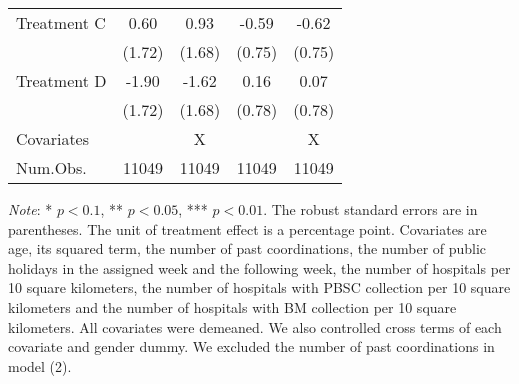 \documentclass[12pt, a4paper]{article}
\begin{document}
\begin{table}[H]
\begin{threeparttable}
\begin{tabular}[t]{lcccc}
\hspace{1em}Treatment C & 0.60 & 0.93 & -0.59 & -0.62\\
\hspace{1em} & (1.72) & (1.68) & (0.75) & (0.75)\\
\hspace{1em}Treatment D & -1.90 & -1.62 & 0.16 & 0.07\\
\hspace{1em} & (1.72) & (1.68) & (0.78) & (0.78)\\
Covariates &  & X &  & X\\
Num.Obs. & \num{11049} & \num{11049} & \num{11049} & \num{11049}\\
\bottomrule
\end{tabular}
\begin{tablenotes}
\item \emph{Note}: * $p < 0.1$, ** $p < 0.05$, *** $p < 0.01$. The robust standard errors are in parentheses. The unit of treatment effect is a percentage point. Covariates are age, its squared term, the number of past coordinations, the number of public holidays in the assigned week and the following week, the number of hospitals per 10 square kilometers, the number of hospitals with PBSC collection per 10 square kilometers and the number of hospitals with BM collection per 10 square kilometers. All covariates were demeaned.  We also controlled cross terms of each covariate and gender dummy. We excluded the number of past coordinations in model (2).
\end{tablenotes}
\end{threeparttable}
\end{table}
\end{document}
